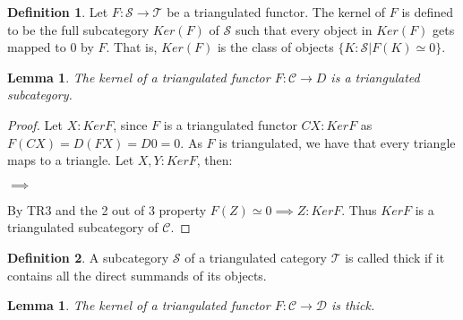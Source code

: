 \documentclass[11pt]{article}
\newtheorem{lemma}[theorem]{Lemma}
\theoremstyle{definition}
\newtheorem{definition}{Definition}[section]
\theoremstyle{remark}
\begin{document}
            \begin{definition}
                Let $F : \mathcal{S} \rightarrow \mathcal{T}$ be a triangulated functor. The kernel of $F$ is defined to be the full subcategory $Ker(F)$ of $\mathcal{S}$ such that every object in $Ker(F)$ gets mapped to $0$ by $F$. That is, $Ker(F)$ is the class of objects $\{K : \mathcal{S} | F(K)\simeq 0\}$.
            \end{definition}

            \begin{lemma}
                The kernel of a triangulated functor $F:\mathcal{C}\rightarrow{D}$ is a triangulated subcategory.
            \end{lemma}

            \begin{proof}
                Let $X:KerF$, since $F$ is a triangulated functor $CX:KerF$ as $F(CX)=D(FX)=D0=0$. As $F$ is triangulated, we have that every triangle maps to a triangle. Let $X,Y:KerF$, then:
                \begin{center}
                    $\implies$
                \end{center}
                By TR3 and the 2 out of 3 property $F(Z)\simeq 0 \implies Z:KerF$. Thus $KerF$ is a triangulated subcategory of $\mathcal{C}$.
            \end{proof}

            \begin{definition}
                A subcategory $\mathcal{S}$ of a triangulated category $\mathcal{T}$ is called thick if it contains all the direct summands of its objects.
            \end{definition}

            \begin{lemma}
                The kernel of a triangulated functor $F:\mathcal{C}\rightarrow\mathcal{D}$ is thick.
            \end{lemma}
\end{document}
